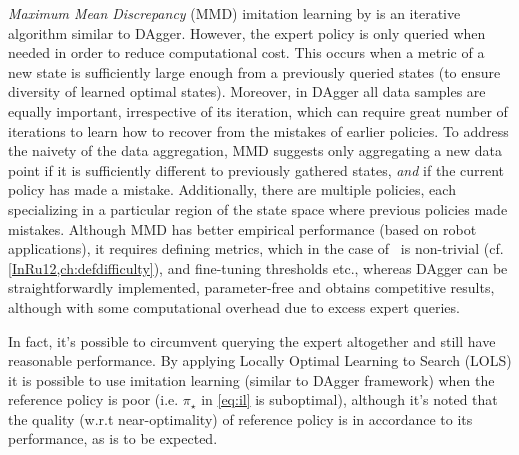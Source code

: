 \emph{Maximum Mean Discrepancy} (MMD) imitation learning by \cite{Kim13} is an 
iterative algorithm similar to DAgger. 
However, the expert policy is only queried when needed in order to reduce 
computational cost. 
This occurs when a metric of a new state is sufficiently large enough from a 
previously queried states (to ensure diversity of learned optimal states). 
Moreover, in DAgger all data samples are equally important, irrespective of its 
iteration, which can require great number of iterations to learn how to recover 
from the mistakes of earlier policies. To address the naivety of the data 
aggregation, MMD suggests only aggregating a new data point 
if it is sufficiently different to previously gathered states, \emph{and} if 
the current policy has made a mistake. 
Additionally, there are multiple policies, each specializing in a particular 
region of the state space where previous policies made mistakes.
Although MMD has better empirical performance (based on robot applications), it 
requires defining metrics, which in the case of \jsp\ is non-trivial (cf. 
\cref{InRu12,ch:defdifficulty}), and fine-tuning thresholds etc., whereas 
DAgger can be straightforwardly implemented, parameter-free and obtains 
competitive results, although with some computational overhead due to excess 
expert queries. 

In fact, it's possible to circumvent querying the expert altogether and still 
have reasonable performance. By applying Locally Optimal Learning to Search 
(LOLS) \cite{ChangKADL15} it is possible to use imitation learning (similar to 
DAgger framework) when the reference policy is poor (i.e. $\pi_\star$ in 
\cref{eq:il} is suboptimal), 
although it's noted that the quality (w.r.t near-optimality) of reference 
policy is in accordance to its performance, as is to be expected. 